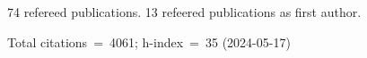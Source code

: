 74 refereed publications. 13 refeered publications as first author.

Total citations~=~4061; h-index~=~35 (2024-05-17)